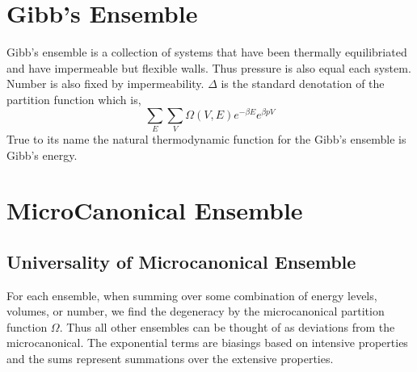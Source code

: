 \section{Gibb's Ensemble}\label{sec:Gibb's Ensemble}
Gibb's ensemble is a collection of systems that have been thermally
equilibriated and have impermeable but flexible walls. Thus pressure is also
equal each system. Number is also fixed by impermeability. $\Delta$ is the
standard denotation of the partition function which is,
\begin{equation*}
\sum_E \sum_V \Omega(V, E)e^{ -\beta E}e^{\beta pV}
\end{equation*}
True to its name the natural thermodynamic function for the Gibb's ensemble is
Gibb's energy.

\section{MicroCanonical Ensemble}%
\label{sec:MicroCanonical}

\subsection{Universality of Microcanonical Ensemble}
For each ensemble, when summing over some combination
of energy levels, volumes, or number, we find the degeneracy by the
microcanonical partition function $\Omega$. Thus all other ensembles can be
thought of as deviations from the microcanonical. The exponential terms are
biasings based on intensive properties and the sums represent summations over
the extensive properties.

